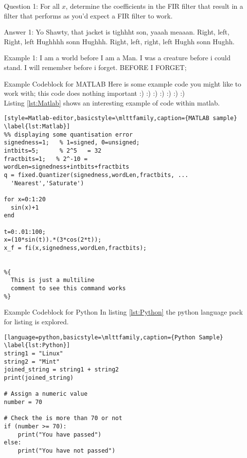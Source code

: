\begin{question}{Question 1:}
  For all $x$, determine the coefficients in the FIR filter that result in a filter that performs as you'd expect a FIR filter to work.
\end{question}

\begin{answer}{Answer 1:}
Yo Shawty, that jacket is tighhht son, yaaah meaaan. Right, left, Right, left Hughhhh sonn Hughhh. Right, left, right, left Hughh sonn Hughh.
\end{answer}

\begin{example}{Example 1:}
I am a world before I am a Man. I was a creature before i could stand. I will remember before i forget. BEFORE I FORGET;
\end{example}

\begin{codeblock}{Example Codeblock for MATLAB}
Here is some example code you might like to work with; this code does nothing important :) :) :) :) :) :) :)\\

Listing \ref{lst:Matlab} shows an interesting example of code within matlab.
\begin{lstlisting}[style=Matlab-editor,basicstyle=\mlttfamily,caption={MATLAB sample} \label{lst:Matlab}]
%% displaying some quantisation error
signedness=1;   % 1=signed, 0=unsigned;
intbits=5;      % 2^5   = 32
fractbits=1;   % 2^-10 =
wordLen=signedness+intbits+fractbits
q = fixed.Quantizer(signedness,wordLen,fractbits, ...
  'Nearest','Saturate')

for x=0:1:20
  sin(x)+1
end

t=0:.01:100;
x=(10*sin(t)).*(3*cos(2*t));
x_f = fi(x,signedness,wordLen,fractbits);


%{
  This is just a multiline
  comment to see this command works
%}
\end{lstlisting}
\end{codeblock}



\begin{codeblock}{Example Codeblock for Python}
In listing \ref{lst:Python} the python language pack for listing is explored.

\begin{lstlisting}[language=python,basicstyle=\mlttfamily,caption={Python Sample} \label{lst:Python}]
string1 = "Linux"
string2 = "Mint"
joined_string = string1 + string2
print(joined_string)

# Assign a numeric value
number = 70

# Check the is more than 70 or not
if (number >= 70):
    print("You have passed")
else:
    print("You have not passed")
\end{lstlisting}
\end{codeblock}
\clearpage
